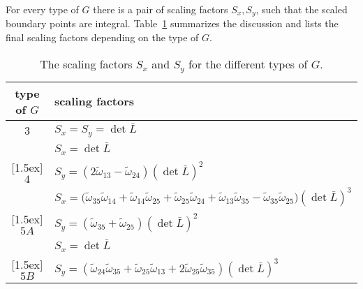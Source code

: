 \documentclass{article}
\theoremstyle{plain} \newtheorem{thm}{Theorem}[section]
\newcommand{\ot}{\tilde{\omega}}
\begin{document}
For every type of $G$ there is a pair of scaling factors $S_{x},S_{y}$, such that the
scaled boundary points are integral. 
Table~\ref{tab:scaling} summarizes the discussion and lists the final
scaling factors depending on the type of $G$.
\renewcommand{\arraystretch}{1.2}
\begin{table}[htb]
   \centering
   \begin{tabular}{cl}
\hline \hline
       type of $G$ & scaling factors \\
     \hline\hline
3    & 
$S_x=
S_y=\det\bar{L}$\\\hline
      &$S_x=\det{\bar{L}}$  \\ 
     \raisebox{1.5ex}[1.5ex]{$4$}     &       $S_y=(2\ot_{13}-\ot_{24})(\det{\bar{L}})^2$\\\hline
      & $S_x={(\ot_{35}\ot_{14}+\ot_{14}\ot_{25}+\ot_{25}\ot_{24}+\ot_{13}\ot_{35}-\ot_{35}\ot_{25}})
 (\det{\bar{L}})^3$ \\ 
     \raisebox{1.5ex}[1.5ex]{$5A$}     &
     $S_y=(\ot_{35}+\ot_{25})  (\det{\bar{L}})^2$ \\ \hline
      & $S_x= \det{\bar{L}}$\\ 
     \raisebox{1.5ex}[1.5ex]{$5B$}     & $S_y=(\ot_{24}\ot_{35}+\ot_{25}\ot_{13}+2\ot_{25}\ot_{35}) 
(\det{\bar{L}})^3$\\ \hline
 \end{tabular}
   \caption{The scaling factors $S_x$ and $S_y$ for the
     different types of $G$.}
 \label{tab:scaling}
 \end{table}
 
\end{document}
